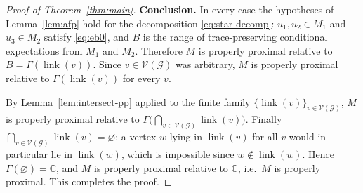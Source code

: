 \documentclass[a4paper, 11pt, reqno]{amsart}
\numberwithin{equation}{section}
\theoremstyle{plain}
\theoremstyle{remark}
\theoremstyle{definition}
\newcommand{\C}{\mathbb{C}}
\newcommand{\VV}{{\mathcal V}}
\newcommand{\GG}{{\mathcal G}}
\begin{document}
\begin{proof}[Proof of Theorem~\ref{thm:main}]
\medskip\noindent\textbf{Conclusion.}
In every case the hypotheses of Lemma~\ref{lem:afp} hold for the decomposition \eqref{eq:star-decomp}: $u_1,u_2\in M_1$ and $u_3\in M_2$ satisfy \eqref{eq:eb0}, and $B$ is the range of trace-preserving conditional expectations from $M_1$ and $M_2$. Therefore $M$ is properly proximal relative to $B=\Gamma(\operatorname{link}(v))$. Since $v\in\VV(\GG)$ was arbitrary, $M$ is properly proximal relative to $\Gamma(\operatorname{link}(v))$ for every $v$.

By Lemma~\ref{lem:intersect-pp} applied to the finite family $\{\operatorname{link}(v)\}_{v\in\VV(\GG)}$, $M$ is properly proximal relative to $\Gamma\big(\bigcap_{v\in\VV(\GG)}\operatorname{link}(v)\big)$. Finally $\bigcap_{v\in\VV(\GG)}\operatorname{link}(v)=\varnothing$: a vertex $w$ lying in $\operatorname{link}(v)$ for all $v$ would in particular lie in $\operatorname{link}(w)$, which is impossible since $w\notin\operatorname{link}(w)$. Hence $\Gamma(\varnothing)=\C$, and $M$ is properly proximal relative to $\C$, i.e.\ $M$ is properly proximal. This completes the proof.
\end{proof}
\end{document}
